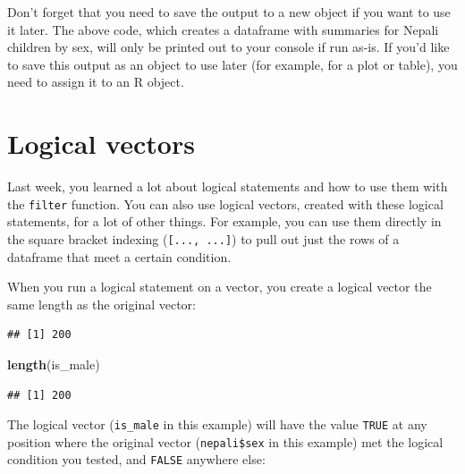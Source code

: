 \documentclass[]{book}
\makeatletter
\newenvironment{Shaded}{\begin{snugshade}}{\end{snugshade}}
\newcommand{\KeywordTok}[1]{\textcolor[rgb]{0.13,0.29,0.53}{\textbf{{#1}}}}
\newcommand{\StringTok}[1]{\textcolor[rgb]{0.31,0.60,0.02}{{#1}}}
\newcommand{\NormalTok}[1]{{#1}}
\newenvironment{kframe}{%
\medskip{}
\setlength{\fboxsep}{.8em}
 \def\at@end@of@kframe{}%
 \ifinner\ifhmode%
  \def\at@end@of@kframe{\end{minipage}}%
  \begin{minipage}{\columnwidth}%
 \fi\fi%
 \def\FrameCommand##1{\hskip\@totalleftmargin \hskip-\fboxsep
 \colorbox{shadecolor}{##1}\hskip-\fboxsep
     \hskip-\linewidth \hskip-\@totalleftmargin \hskip\columnwidth}%
 \MakeFramed {\advance\hsize-\width
   \@totalleftmargin\z@ \linewidth\hsize
   \@setminipage}}%
 {\par\unskip\endMakeFramed%
 \at@end@of@kframe}
\renewenvironment{Shaded}{\begin{kframe}}{\end{kframe}}
\newenvironment{rmdblock}[1]
  {
  \begin{itemize}
  \renewcommand{\labelitemi}{
    \raisebox{-.7\height}[0pt][0pt]{
      {\setkeys{Gin}{width=3em,keepaspectratio}\texttt{[image: images/\#1]}}
    }
  }
  \setlength{\fboxsep}{1em}
  \begin{kframe}
  \item
  }
  {
  \end{kframe}
  \end{itemize}
  }
\newenvironment{rmdnote}
  {\begin{rmdblock}{note}}
  {\end{rmdblock}}
\makeatother
\begin{document}
\begin{rmdnote}
Don't forget that you need to save the output to a new object if you
want to use it later. The above code, which creates a dataframe with
summaries for Nepali children by sex, will only be printed out to your
console if run as-is. If you'd like to save this output as an object to
use later (for example, for a plot or table), you need to assign it to
an R object.
\end{rmdnote}

\section{Logical vectors}\label{logical-vectors}

Last week, you learned a lot about logical statements and how to use
them with the \texttt{filter} function. You can also use logical
vectors, created with these logical statements, for a lot of other
things. For example, you can use them directly in the square bracket
indexing (\texttt{{[}...,\ ...{]}}) to pull out just the rows of a
dataframe that meet a certain condition.

When you run a logical statement on a vector, you create a logical
vector the same length as the original vector:

\begin{Shaded}
\end{Shaded}

\begin{verbatim}
## [1] 200
\end{verbatim}

\begin{Shaded}
\begin{Highlighting}[]
\KeywordTok{length}\NormalTok{(is_male)}
\end{Highlighting}
\end{Shaded}

\begin{verbatim}
## [1] 200
\end{verbatim}

The logical vector (\texttt{is\_male} in this example) will have the
value \texttt{TRUE} at any position where the original vector
(\texttt{nepali\$sex} in this example) met the logical condition you
tested, and \texttt{FALSE} anywhere else:
\end{document}
